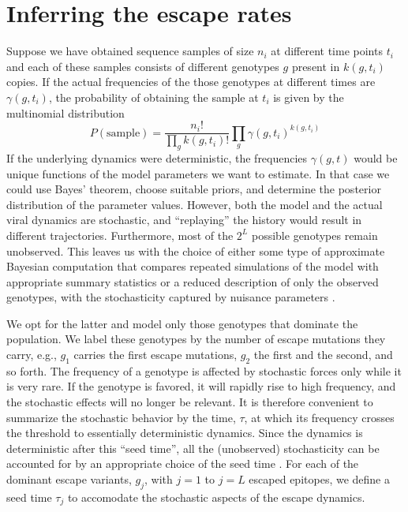 \documentclass{frontiers}
\newcommand{\gt}{g}
\newcommand{\gtfreq}{\gamma}
\begin{document}
\section{Inferring the escape rates}
Suppose we have obtained sequence samples of size $n_i$ at different time points
$t_i$ and each of these samples consists of different genotypes $\gt$ present in
$k(\gt,t_i)$ copies. If the actual frequencies of the those genotypes at
different times are $\gtfreq(\gt,t_i)$, the probability of obtaining the sample at
$t_i$ is  given by the multinomial distribution
\begin{equation}
P(\mathrm{sample}) = \frac{n_i!}{\prod_\gt
k(\gt,t_i)!}\prod_{\gt}\gtfreq(\gt,t_i)^{k(\gt,t_i)}
\end{equation}
If the underlying dynamics were deterministic, the frequencies $\gtfreq(\gt,t)$
would be unique functions of the model parameters we want to estimate. In that
case we could use Bayes' theorem, choose suitable priors, and determine the
posterior distribution of the parameter values. However, both the
model and the actual viral dynamics are stochastic, and ``replaying''
the history would result in different trajectories. Furthermore, most of the $2^L$ possible
genotypes remain unobserved. This leaves us with the choice of either
some type of approximate Bayesian computation that compares repeated simulations
of the model with appropriate summary statistics \citep{sunnaker_approximate_2013} 
or a reduced description
of only the observed genotypes, with the stochasticity captured by nuisance parameters
\citep{basu_elimination_1977}.

We opt for the latter and model only those genotypes that dominate the
population.  We label these genotypes by the number of escape mutations
they carry, e.g., $\gt_1$ carries the first escape mutations, $\gt_2$
the first and the second, and so forth.  The 
frequency of a genotype is
affected by stochastic forces only while it is very rare. If the
genotype is favored, it will rapidly rise to high frequency, and the
stochastic effects will no longer be relevant. It is therefore
convenient to summarize the stochastic behavior by the time, $\tau$,
at which its frequency crosses the threshold to essentially
deterministic dynamics.  Since the dynamics is deterministic after this
``seed time'', all the (unobserved) stochasticity can be accounted for by
an appropriate choice of the seed time
\citep{Kepler:1995p26819,Desai:2007p954}. For each of the dominant
escape variants, $\gt_j$, with $j=1$ to $j=L$ escaped epitopes, we define a
seed time $\tau_j$ to accomodate the stochastic aspects of the escape dynamics. 
\end{document}
